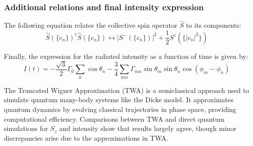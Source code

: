 \documentclass{article}
\begin{document}
    \subsubsection{Additional relations and final intensity expression}
    The following equation relates the collective spin operator $\hat{S}$ to its components:
    \begin{equation}
        \hat{S}(\{c_n\})^\dagger \hat{S}(\{c_n\}) \leftrightarrow |S^-(\{c_n\})|^2 + \frac{1}{2} S^z(\{ |c_n|^2 \})
    \end{equation}

    Finally, the expression for the radiated intensity as a function of time is given by:
    \begin{equation}
        I(t) = - \frac{\sqrt{3}}{2} \Gamma_0 \sum_n \cos \theta_n - \frac{3}{4} \sum_{mn} \Gamma_{mn} \sin \theta_m \sin \theta_n \cos(\phi_m - \phi_n)
    \end{equation}

    The Truncated Wigner Approximation (TWA) is a semiclassical approach used to simulate quantum many-body systems like the Dicke model. It approximates quantum dynamics by evolving classical trajectories in phase space, providing computational efficiency. Comparisons between TWA and direct quantum simulations for $S_z$ and intensity show that results largely agree, though minor discrepancies arise due to the approximations in TWA. 
\end{document}
